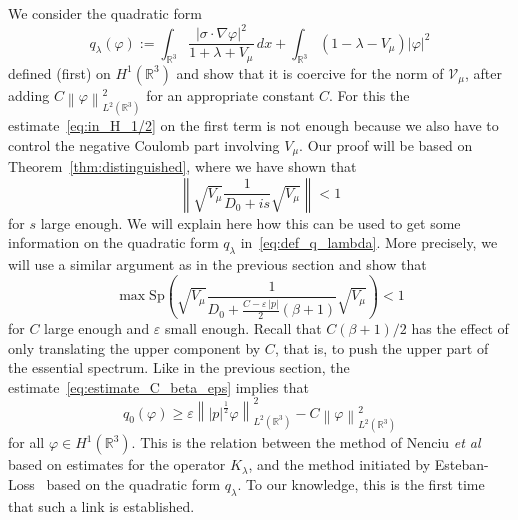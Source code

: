 \documentclass[AHL,Unicode,published]{cedram}
\newcommand{\R}{\mathbb{R}}
\newcommand{\cV}{\mathcal{V}}
\newcommand{\Spec}{\mathrm{Sp}}
\newcommand\1{{\ensuremath {\mathds 1} }}
\renewcommand\phi{\varphi}
\newcommand{\norm}[1]{ \left\| #1 \right\|}
\renewcommand{\geq}{\geqslant}
\newcommand{\eps}{\varepsilon}
\begin{document}
We consider the quadratic form
\begin{equation}\label{eq:def_q_lambda_bis}
q_\lambda(\phi):=\int_{\R^3}\frac{\left|\sigma\cdot\nabla\phi\right|^2}{1+\lambda+V_\mu}\,dx+\int_{\R^3}\left(1-\lambda-V_\mu\right)|\phi|^2
\end{equation}
defined (first) on $H^1(\R^3)$ and show that it is coercive for the norm of $\cV_\mu$, after adding $C\norm{\phi}_{L^2(\R^3)}^2$ for an appropriate constant $C$. For this the estimate~\eqref{eq:in_H_1/2} on the first term is not enough because we also have to control the negative Coulomb part involving $V_\mu$. Our proof will be based on Theorem~\ref{thm:distinguished}, where we have shown that
\begin{equation}\label{eq:estimate_i_s}
\norm{\sqrt{V_\mu}\frac1{D_0+is}\sqrt{V_\mu}}<1
\end{equation}
for $s$ large enough. We will explain here how this can be used to get some information on the quadratic form $q_\lambda$ in~\eqref{eq:def_q_lambda}. More precisely, we will use a similar argument as in the previous section and show that
\begin{equation}\label{eq:estimate_C_beta_eps}
\max\Spec\left(\sqrt{V_\mu}\frac1{D_0+\frac{C-\eps\,|p|}2 (\beta+1)}\sqrt{V_\mu}\right)<1
\end{equation}
for $C$ large enough and $\eps$ small enough. Recall that $C(\beta+1)/2$ has the effect of only translating the upper component by $C$, that is, to push the upper part of the essential spectrum. Like in the previous section, the estimate~\eqref{eq:estimate_C_beta_eps} implies that
\begin{equation}\label{eq:bound_q_0}
q_0(\phi)\geq\eps\norm{|p|^{\frac12}\phi}_{L^2\left(\R^3\right)}^2-C\norm{\phi}_{L^2\left(\R^3\right)}^2
\end{equation}
for all $\phi\in H^1(\R^3)$. This is the relation between the method of Nenciu \emph{et al}~\cite{Nenciu-76} based on estimates for the operator $K_\lambda$, and the method initiated by Esteban-Loss~\cite{EstLos-07,EstLos-08} based on the quadratic form $q_\lambda$. To our knowledge, this is the first time that such a link is established.


\end{document}
